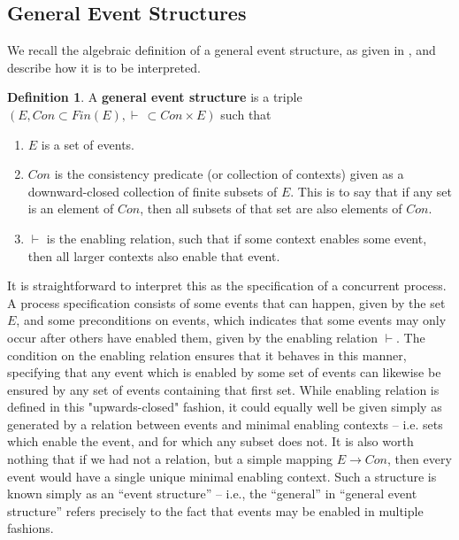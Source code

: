 \documentclass[hoptionsi,review,screen,format=sigconf]{acmart}
\theoremstyle{definition}
\newtheorem{definition}{Definition}[section]
\begin{document}
\subsection{General Event Structures}

We recall the algebraic definition of a general event structure, as given in \cite{winskel1986event}, and describe how it is to be interpreted.

\begin{definition}
A \textbf{general event structure} is a triple \((E, Con \subset Fin(E), \vdash \, \subset Con \times E)\) such that

 \renewcommand{\labelenumi}{\roman{enumi}}
  \begin{enumerate}
   \item \(E\) is a set of events.
   \item \(Con\) is the consistency predicate (or collection of contexts) given as a downward-closed collection of finite subsets of \(E\). This is to say that if any set is an element of \(Con\), then all subsets of that set are also elements of \(Con\).
   \item \(\vdash\) is the enabling relation, such that if some context enables some event, then all larger contexts also enable that event.
 \end{enumerate}
\end{definition}

It is straightforward to interpret this as the specification of a concurrent process. A process specification consists of some events that can happen, given by the set \(E\), and some preconditions on events, which indicates that some events may only occur after others have enabled them, given by the enabling relation \(\vdash\). The condition on the enabling relation ensures that it behaves in this manner, specifying that any event which is enabled by some set of events can likewise be ensured by any set of events containing that first set. While enabling relation is defined in this "upwards-closed" fashion, it could equally well be given simply as generated by a relation between events and minimal enabling contexts -- i.e. sets which enable the event, and for which any subset does not. It is also worth nothing that if we had not a relation, but a simple mapping \(E \to Con\), then every event would have a single unique minimal enabling context. Such a structure is known simply as an ``event structure'' -- i.e., the ``general'' in ``general event structure'' refers precisely to the fact that events may be enabled in multiple fashions.
\end{document}
